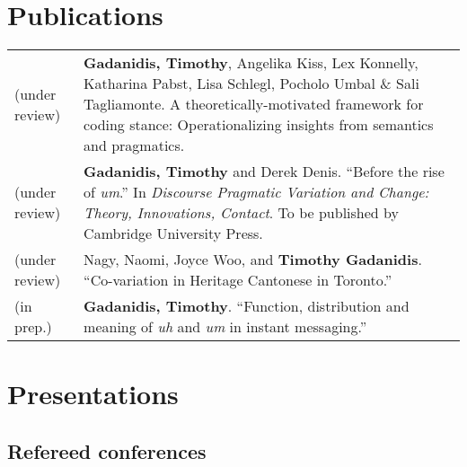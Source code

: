 \documentclass[letterpaper]{article}
\begin{document}

\section*{Publications}
\begin{longtable}{p{}p{}}
    (under review) &\textbf{Gadanidis, Timothy}, Angelika Kiss, Lex Konnelly,
    Katharina Pabst, Lisa Schlegl, Poc\-holo Umbal \& Sali Tagliamonte. A
    theoretically-motivated framework for coding stance: Operationalizing
    insights from semantics and pragmatics. \\
    (under review) &\textbf{Gadanidis, Timothy} and Derek Denis. ``Before the rise
    of \emph{um}.'' In \textit{Discourse Pragmatic Variation and Change: Theory,
    Innovations, Contact}. To be published by Cambridge University Press. \\
    (under review) &Nagy, Naomi, Joyce Woo, and \textbf{Timothy Gadanidis}.
    ``Co-variation in Heritage Cantonese in Toronto.'' \\
    (in prep.) &\textbf{Gadanidis, Timothy}. ``Function, distribution and
    meaning of \emph{uh} and \emph{um} in instant messaging.'' \\
\end{longtable}

\section*{Presentations}

\subsection*{Refereed conferences}
\end{document}
